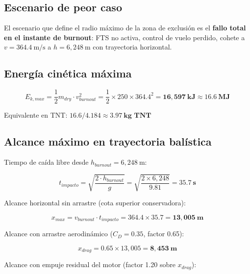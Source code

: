 \documentclass[11pt, a4paper]{article}
\begin{document}
\subsection{Escenario de peor caso}

El escenario que define el radio m\'{a}ximo de la zona de exclusi\'{o}n es el \textbf{fallo total en el instante de burnout}: FTS no activa, control de vuelo perdido, cohete a $v = 364.4\ \text{m/s}$ a $h = 6{,}248\ \text{m}$ con trayectoria horizontal.

\subsection{Energ\'{i}a cin\'{e}tica m\'{a}xima}

\begin{equation}
  E_{k,max} = \frac{1}{2} m_{dry} \cdot v_{burnout}^2
  = \frac{1}{2} \times 250 \times 364.4^2
  = \mathbf{16{,}597\ \text{kJ} \approx 16.6\ \text{MJ}}
\end{equation}

Equivalente en TNT: $16.6 / 4.184 \approx \mathbf{3.97\ \text{kg TNT}}$

\subsection{Alcance m\'{a}ximo en trayectoria balística}

Tiempo de ca\'{i}da libre desde $h_{burnout} = 6{,}248\ \text{m}$:

\begin{equation}
  t_{impacto} = \sqrt{\frac{2 \cdot h_{burnout}}{g}} = \sqrt{\frac{2 \times 6{,}248}{9.81}} = \mathbf{35.7\ \text{s}}
\end{equation}

Alcance horizontal sin arrastre (cota superior conservadora):

\begin{equation}
  x_{max} = v_{burnout} \cdot t_{impacto} = 364.4 \times 35.7 = \mathbf{13{,}005\ \text{m}}
\end{equation}

Alcance con arrastre aerodin\'{a}mico ($C_D = 0.35$, factor 0.65):

\begin{equation}
  x_{drag} = 0.65 \times 13{,}005 = \mathbf{8{,}453\ \text{m}}
\end{equation}

Alcance con empuje residual del motor (factor 1.20 sobre $x_{drag}$):
\end{document}
